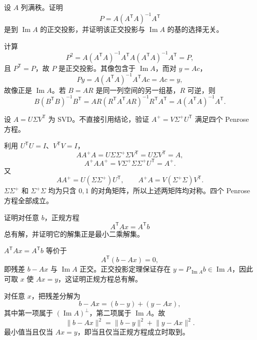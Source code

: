 \begin{exercise}[level=standard]
设 $A$ 列满秩。证明
\[
P=A(A^{\mathsf T}A)^{-1}A^{\mathsf T}
\]
是到 $\operatorname{Im}A$ 的正交投影，并证明该正交投影与 $\operatorname{Im}A$ 的基的选择无关。
\begin{solution}
计算
\[
P^2=A(A^{\mathsf T}A)^{-1}A^{\mathsf T}A
(A^{\mathsf T}A)^{-1}A^{\mathsf T}=P,
\]
且 $P^{\mathsf T}=P$，故 $P$ 是正交投影。其像包含于 $\operatorname{Im}A$，而对 $y=Ac$，
\[
Py=A(A^{\mathsf T}A)^{-1}A^{\mathsf T}Ac=Ac=y,
\]
故像正是 $\operatorname{Im}A$。若 $B=AR$ 是同一列空间的另一组基，$R$ 可逆，则
\[
B(B^{\mathsf T}B)^{-1}B^{\mathsf T}
=AR(R^{\mathsf T}A^{\mathsf T}AR)^{-1}R^{\mathsf T}A^{\mathsf T}
=A(A^{\mathsf T}A)^{-1}A^{\mathsf T}.
\]
\end{solution}
\end{exercise}

\begin{exercise}[level=advanced]
设 $A=U\Sigma V^{\mathsf T}$ 为 SVD。不直接引用结论，验证
$A^+=V\Sigma^+U^{\mathsf T}$ 满足四个 Penrose 方程。
\begin{solution}
利用 $U^{\mathsf T}U=I$、$V^{\mathsf T}V=I$，
\[
AA^+A
=U\Sigma\Sigma^+\Sigma V^{\mathsf T}
=U\Sigma V^{\mathsf T}=A,
\]
\[
A^+AA^+
=V\Sigma^+\Sigma\Sigma^+U^{\mathsf T}=A^+.
\]
又
\[
AA^+=U(\Sigma\Sigma^+)U^{\mathsf T},
\qquad
A^+A=V(\Sigma^+\Sigma)V^{\mathsf T}.
\]
$\Sigma\Sigma^+$ 和 $\Sigma^+\Sigma$ 均为只含 $0,1$ 的对角矩阵，所以上述两矩阵均对称。四个 Penrose 方程全部成立。
\end{solution}
\end{exercise}

\begin{exercise}[level=advanced]
证明对任意 $b$，正规方程
\[
A^{\mathsf T}Ax=A^{\mathsf T}b
\]
总有解，并证明它的解集正是最小二乘解集。
\begin{solution}
$A^{\mathsf T}Ax=A^{\mathsf T}b$ 等价于
\[
A^{\mathsf T}(b-Ax)=0,
\]
即残差 $b-Ax$ 与 $\operatorname{Im}A$ 正交。正交投影定理保证存在 $y=P_{\operatorname{Im}A}b\in\operatorname{Im}A$，因此可取 $x$ 使 $Ax=y$，这证明正规方程总有解。

对任意 $x$，把残差分解为
\[
b-Ax=(b-y)+(y-Ax),
\]
其中第一项属于 $(\operatorname{Im}A)^\perp$，第二项属于 $\operatorname{Im}A$。故
\[
\lVert b-Ax\rVert^2
=\lVert b-y\rVert^2+\lVert y-Ax\rVert^2.
\]
最小值当且仅当 $Ax=y$，即当且仅当正规方程成立时取到。
\end{solution}
\end{exercise}

